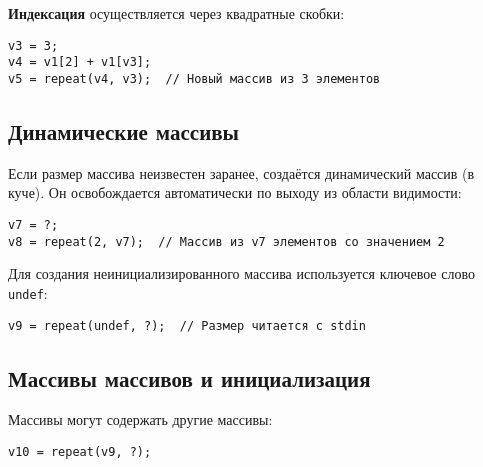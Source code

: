 \documentclass[a4paper,12pt]{article}
\begin{document}
\textbf{Индексация} осуществляется через квадратные скобки:

\begin{tcolorbox}[colback=bg, colframe=frame, title=Индексирование массива]
\begin{verbatim}
v3 = 3;
v4 = v1[2] + v1[v3];
v5 = repeat(v4, v3);  // Новый массив из 3 элементов
\end{verbatim}
\end{tcolorbox}

\subsection{Динамические массивы}

Если размер массива неизвестен заранее, создаётся динамический массив (в куче). Он освобождается автоматически по выходу из области видимости:

\begin{tcolorbox}[colback=bg, colframe=frame, title=Пример динамического массива]
\begin{verbatim}
v7 = ?;
v8 = repeat(2, v7);  // Массив из v7 элементов со значением 2
\end{verbatim}
\end{tcolorbox}

Для создания неинициализированного массива используется ключевое слово \texttt{undef}:

\begin{tcolorbox}[colback=bg, colframe=frame, title=Неинициализированный массив]
\begin{verbatim}
v9 = repeat(undef, ?);  // Размер читается с stdin
\end{verbatim}
\end{tcolorbox}

\subsection{Массивы массивов и инициализация}

Массивы могут содержать другие массивы:

\begin{tcolorbox}[colback=bg, colframe=frame, title=Массив массивов]
\begin{verbatim}
v10 = repeat(v9, ?);
\end{verbatim}
\end{tcolorbox}
\end{document}
